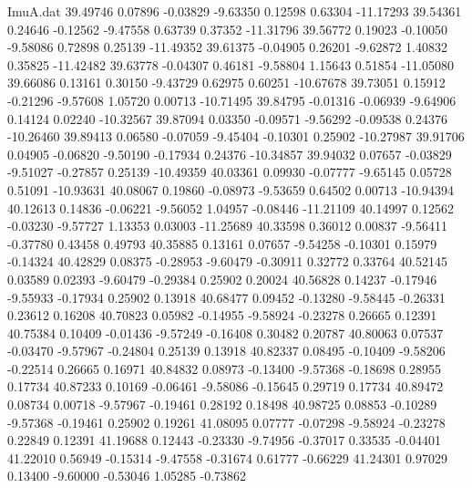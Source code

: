 \begin{filecontents}{ImuA.dat}
  39.49746    0.07896   -0.03829   -9.63350    0.12598    0.63304  -11.17293
  39.54361    0.24646   -0.12562   -9.47558    0.63739    0.37352  -11.31796
  39.56772    0.19023   -0.10050   -9.58086    0.72898    0.25139  -11.49352
  39.61375   -0.04905    0.26201   -9.62872    1.40832    0.35825  -11.42482
  39.63778   -0.04307    0.46181   -9.58804    1.15643    0.51854  -11.05080
  39.66086    0.13161    0.30150   -9.43729    0.62975    0.60251  -10.67678
  39.73051    0.15912   -0.21296   -9.57608    1.05720    0.00713  -10.71495
  39.84795   -0.01316   -0.06939   -9.64906    0.14124    0.02240  -10.32567
  39.87094    0.03350   -0.09571   -9.56292   -0.09538    0.24376  -10.26460
  39.89413    0.06580   -0.07059   -9.45404   -0.10301    0.25902  -10.27987
  39.91706    0.04905   -0.06820   -9.50190   -0.17934    0.24376  -10.34857
  39.94032    0.07657   -0.03829   -9.51027   -0.27857    0.25139  -10.49359
  40.03361    0.09930   -0.07777   -9.65145    0.05728    0.51091  -10.93631
  40.08067    0.19860   -0.08973   -9.53659    0.64502    0.00713  -10.94394
  40.12613    0.14836   -0.06221   -9.56052    1.04957   -0.08446  -11.21109
  40.14997    0.12562   -0.03230   -9.57727    1.13353    0.03003  -11.25689
  40.33598    0.36012    0.00837   -9.56411   -0.37780    0.43458    0.49793
  40.35885    0.13161    0.07657   -9.54258   -0.10301    0.15979   -0.14324
  40.42829    0.08375   -0.28953   -9.60479   -0.30911    0.32772    0.33764
  40.52145    0.03589    0.02393   -9.60479   -0.29384    0.25902    0.20024
  40.56828    0.14237   -0.17946   -9.55933   -0.17934    0.25902    0.13918
  40.68477    0.09452   -0.13280   -9.58445   -0.26331    0.23612    0.16208
  40.70823    0.05982   -0.14955   -9.58924   -0.23278    0.26665    0.12391
  40.75384    0.10409   -0.01436   -9.57249   -0.16408    0.30482    0.20787
  40.80063    0.07537   -0.03470   -9.57967   -0.24804    0.25139    0.13918
  40.82337    0.08495   -0.10409   -9.58206   -0.22514    0.26665    0.16971
  40.84832    0.08973   -0.13400   -9.57368   -0.18698    0.28955    0.17734
  40.87233    0.10169   -0.06461   -9.58086   -0.15645    0.29719    0.17734
  40.89472    0.08734    0.00718   -9.57967   -0.19461    0.28192    0.18498
  40.98725    0.08853   -0.10289   -9.57368   -0.19461    0.25902    0.19261
  41.08095    0.07777   -0.07298   -9.58924   -0.23278    0.22849    0.12391
  41.19688    0.12443   -0.23330   -9.74956   -0.37017    0.33535   -0.04401
  41.22010    0.56949   -0.15314   -9.47558   -0.31674    0.61777   -0.66229
  41.24301    0.97029    0.13400   -9.60000   -0.53046    1.05285   -0.73862

\end{filecontents}
